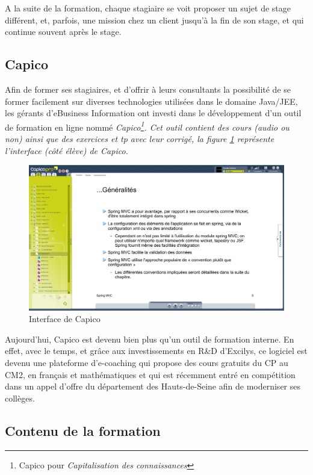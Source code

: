 A la suite de la formation, chaque stagiaire se voit proposer un sujet de stage différent, et, parfois, une mission chez un client jusqu'à la fin de son stage, et qui continue souvent après le stage. 

\subsection{Capico}

Afin de former ses stagiaires, et d'offrir à leurs consultants la possibilité de se former facilement sur diverses technologies utilisées dans le domaine Java/JEE, les gérants d'eBusiness Information ont investi dans le développement d'un outil de formation en ligne nommé \em{Capico}\footnote{Capico pour \em{Capi}talisation des \em{co}nnaissances}. Cet outil contient des cours (audio ou non) ainsi que des exercices et tp avec leur corrigé, la figure \ref{capico} représente l'interface (côté élève) de Capico.

\begin{figure}[ht]
\begin{center}
\includegraphics[width=400pt]{img/capico.png}
\end{center}
\caption{Interface de Capico}
\label{capico}
\end{figure}

Aujourd'hui, Capico est devenu bien plus qu'un outil de formation interne. En effet, avec le temps, et grâce aux investissements en R\&D d'Excilys, ce logiciel est devenu une plateforme d'e-coaching qui propose des cours gratuits du CP au CM2, en français et mathématiques\cite{capicofr} et qui est récemment entré en compétition dans un appel d'offre du département des Hauts-de-Seine afin de moderniser ses collèges.  

\subsection{Contenu de la formation}


